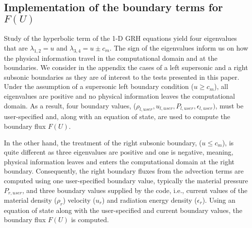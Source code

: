 \subsection{Implementation of the boundary terms for $F(U)$}
%
Study of the hyperbolic term of the 1-D GRH equations yield four eigenvalues that are $\lambda_{1,2}=u$ and $\lambda_{3,4}=u \pm c_m$. The sign of the eigenvalues inform us on how the physical information travel in the computational domain and at the boundaries. We consider in the appendix the cases of a left supersonic and a right subsonic boundaries as they are of interest to the tests presented in this paper. Under the assumption of a supersonic left boundary condition ($u \geq c_m$), all eigenvalues are positive and no physical information leaves the computational domain. As a result, four boundary values, ($\rho_{l, user}, u_{l, user}, P_{l, user}, \epsilon_{l, user})$, must be user-specified and, along with an equation of state, are used to compute the boundary flux $F(U)$. 

In the other hand, the treatment of the right subsonic boundary, ($u \leq c_m$), is quite different as three eigenvalues are positive and one is negative, meaning, physical information leaves and enters the computational domain at the right boundary. Consequently, the right boundary fluxes from the advection terms are computed using one user-specified boundary value, typically the material pressure $P_{r, user}$, and three boundary values supplied by the code, i.e., current values of the material density ($\rho_{r}$) velocity ($u_{r}$) and radiation energy density ($\epsilon_{r}$). Using an equation of state along with the user-specified and current boundary values, the boundary flux $F(U)$ is computed.
%
